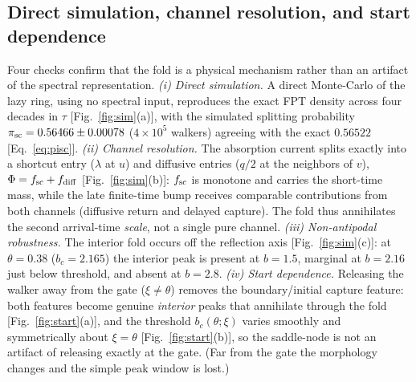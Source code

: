 \documentclass[reprint,amsmath,amssymb,aps,prresearch,longbibliography]{revtex4-2}
\begin{document}
\subsection{Direct simulation, channel resolution, and start dependence}\label{sec:univE}
Four checks confirm that the fold is a physical mechanism rather than an artifact of the spectral
representation. \emph{(i) Direct simulation.} A direct Monte-Carlo of the lazy ring, using no spectral
input, reproduces the exact FPT density across four decades in $\tau$ [Fig.~\ref{fig:sim}(a)], with the
simulated splitting probability $\pi_{\rm sc}=0.56466\pm0.00078$ ($4\times10^5$ walkers) agreeing
with the exact $0.56522$ [Eq.~\eqref{eq:pisc}]. \emph{(ii) Channel resolution.} The absorption current splits exactly into a shortcut
entry ($\lambda$ at $u$) and diffusive entries ($q/2$ at the neighbors of $v$),
$\Phi=f_{\rm sc}+f_{\rm diff}$ [Fig.~\ref{fig:sim}(b)]: $f_{\rm sc}$ is monotone and carries the
short-time mass, while the late finite-time bump receives comparable contributions from both channels
(diffusive return and delayed capture). The fold thus annihilates the second arrival-time \emph{scale},
not a single pure channel. \emph{(iii) Non-antipodal robustness.} The interior fold occurs off the
reflection axis [Fig.~\ref{fig:sim}(c)]: at $\theta=0.38$ ($b_c=2.165$) the interior peak is present
at $b=1.5$, marginal at $b=2.16$ just below threshold, and absent at $b=2.8$. \emph{(iv) Start dependence.} Releasing the walker away from the gate ($\xi\neq\theta$)
removes the boundary/initial capture feature: both features become genuine \emph{interior} peaks that
annihilate through the fold [Fig.~\ref{fig:start}(a)], and the threshold $b_c(\theta;\xi)$ varies
smoothly and symmetrically about $\xi=\theta$ [Fig.~\ref{fig:start}(b)], so the saddle-node is not an
artifact of releasing exactly at the gate. (Far from the gate the morphology changes and the simple
peak window is lost.)
\end{document}
